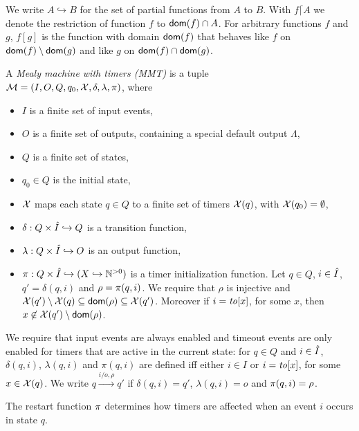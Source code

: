 We write $A \hookrightarrow B$ for the set of partial functions from $A$ to $B$.
With $f \lceil A$ we denote the restriction of function $f$ to ${\textsf{dom}}(f) \cap A$.
For arbitrary functions $f$ and $g$, $f [g]$ is the function with domain ${\textsf{dom}}(f)$ that behaves like $f$
on ${\textsf{dom}}(f) \setminus {\textsf{dom}}(g)$ and like $g$ on ${\textsf{dom}}(f) \cap {\textsf{dom}}(g)$.

\begin{definition}
\label{def:MMT}
A \emph{Mealy machine with timers (MMT)} is a tuple
\\
${\cal M} = (I, O, Q, q_0, \mathcal{X}, \delta, \lambda, \pi)$, where
\begin{itemize}
\item
$I$ is a finite set of input events,
\item
$O$ is a finite set of outputs, containing a special default output $\Lambda$,
\item
$Q$ is a finite set of states,
\item
$q_0 \in Q$ is the initial state,
\item
$\mathcal{X}$ maps each state $q \in Q$ to a finite set of timers $\mathcal{X}(q)$, with $\mathcal{X}(q_0) = \emptyset$,
\item
$\delta: Q \times \hat{I} \hookrightarrow  Q$ is a transition function,
\item
$\lambda: Q \times \hat{I} \hookrightarrow O$ is an output function, 
\item
$\pi : Q \times \hat{I} \hookrightarrow (X \hookrightarrow {\mathbb N}^{>0})$ is a timer initialization function.
Let $q \in Q$, $i \in \hat{I}$, $q'=\delta(q,i)$ and $\rho=\pi(q,i)$. 
We require that $\rho$ is injective and $\mathcal{X}(q') \setminus \mathcal{X}(q) \subseteq {\textsf{dom}}(\rho) \subseteq\mathcal{X}(q')$. Moreover
  if $i=\mathit{to}[x]$, for some $x$, then $x \not\in \mathcal{X}(q') \setminus {\textsf{dom}}(\rho)$.
\end{itemize}
We require that input events are always enabled and timeout events are only enabled
for timers that are active in the current state:
for $q \in Q$ and $i \in \hat{I}$,  $\delta(q,i)$, $\lambda(q,i)$ and $\pi(q,i)$ are defined iff either
$i \in I$ or $i=\mathit{to}[x]$, for some $x \in\mathcal{X}(q)$.
We write $q \xrightarrow{i/o,\rho} q'$ if $\delta(q,i) = q'$, $\lambda(q,i)= o$ and $\pi(q,i) = \rho$.
\end{definition}
The restart function $\pi$ determines how timers are affected when an event $i$ occurs in state $q$.
